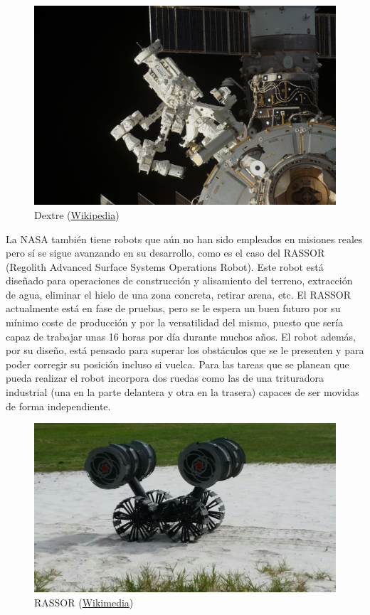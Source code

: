 \begin{figure}[!h]
	\centering
	\includegraphics[scale=0.1]{./EtapaModerna/Imagenes/dextre.jpg}
	\caption{Dextre (\href{https://lv.wikipedia.org/wiki/Att\%C4\%93ls:Dextre_on_ISS.jpg}{Wikipedia})}
	\label{fig:dextre}
\end{figure}

La NASA también tiene robots que aún no han sido empleados en misiones reales pero sí se sigue avanzando en su desarrollo, como es el caso del RASSOR (Regolith Advanced Surface Systems Operations Robot). Este robot está diseñado para operaciones de construcción y alisamiento del terreno, extracción de agua, eliminar el hielo de una zona concreta, retirar arena, etc. El RASSOR actualmente está en fase de pruebas, pero se le espera un buen futuro por su mínimo coste de producción y por la versatilidad del mismo, puesto que sería capaz de trabajar unas 16 horas por día durante muchos años. El robot además, por su diseño, está pensado para superar los obstáculos que se le presenten y para poder corregir su posición incluso si vuelca. Para las tareas que se planean que pueda realizar el robot incorpora dos ruedas como las de una trituradora industrial (una en la parte delantera y otra en la trasera) capaces de ser movidas de forma independiente.

\begin{figure}[!h]
	\centering
	\includegraphics[scale=0.3]{./EtapaModerna/Imagenes/rassor.jpg}
	\caption{RASSOR (\href{https://commons.wikimedia.org/wiki/File:NASA\%27s_Regolith_Advanced_Surface_Systems_Operations_Robot_(RASSOR).jpg}{Wikimedia})}
	\label{fig:rassor}
\end{figure}

